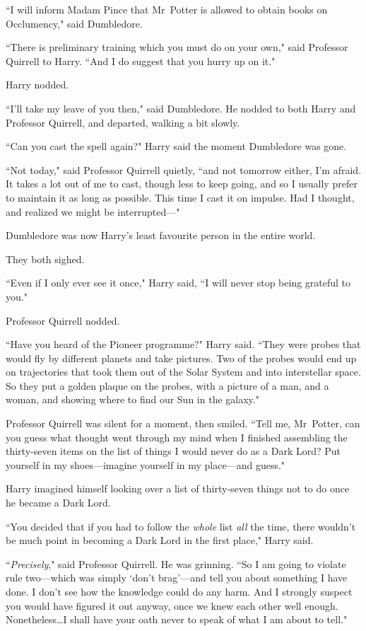 ``I will inform Madam Pince that Mr~Potter is allowed to obtain books on Occlumency," said Dumbledore.

``There is preliminary training which you must do on your own," said Professor Quirrell to Harry. ``And I do suggest that you hurry up on it."

Harry nodded.

``I'll take my leave of you then," said Dumbledore. He nodded to both Harry and Professor Quirrell, and departed, walking a bit slowly.

``Can you cast the spell again?" Harry said the moment Dumbledore was gone.

``Not today," said Professor Quirrell quietly, ``and not tomorrow either, I'm afraid. It takes a lot out of me to cast, though less to keep going, and so I usually prefer to maintain it as long as possible. This time I cast it on impulse. Had I thought, and realized we might be interrupted—"

Dumbledore was now Harry's least favourite person in the entire world.

They both sighed.

``Even if I only ever see it once," Harry said, ``I will never stop being grateful to you."

Professor Quirrell nodded.

``Have you heard of the Pioneer programme?" Harry said. ``They were probes that would fly by different planets and take pictures. Two of the probes would end up on trajectories that took them out of the Solar System and into interstellar space. So they put a golden plaque on the probes, with a picture of a man, and a woman, and showing where to find our Sun in the galaxy."

Professor Quirrell was silent for a moment, then smiled. ``Tell me, Mr~Potter, can you guess what thought went through my mind when I finished assembling the thirty-seven items on the list of things I would never do as a Dark Lord? Put yourself in my shoes—imagine yourself in my place—and guess."

Harry imagined himself looking over a list of thirty-seven things not to do once he became a Dark Lord.

``You decided that if you had to follow the \emph{whole} list \emph{all} the time, there wouldn't be much point in becoming a Dark Lord in the first place," Harry said.

``\emph{Precisely}," said Professor Quirrell. He was grinning. ``So I am going to violate rule two—which was simply `don't brag'—and tell you about something I have done. I don't see how the knowledge could do any harm. And I strongly suspect you would have figured it out anyway, once we knew each other well enough. Nonetheless…I shall have your oath never to speak of what I am about to tell."


